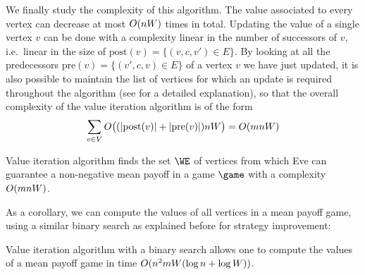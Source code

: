 We finally study the complexity of this algorithm. The
value associated to every vertex can decrease at most
$O(nW)$ times in total. Updating the value of a single
vertex $v$ can be done with a complexity linear in the number of
successors of $v$, i.e.~linear in the size of
$\mathrm{post}(v) = \{(v,c,v')\in E\}$. By looking at all the
predecessors $\mathrm{pre}(v) = \{(v',c,v)\in E\}$ of a vertex $v$ we
have just updated, it is also possible to maintain the list of
vertices for which an update is required throughout the algorithm (see
\cite{Brim&Chaloupka&Doyen&Gentilini&Raskin:2011} for a detailed
explanation), so that the overall complexity of the value iteration
algorithm is of the form
\[\sum_{v\in V}O\big((|\mathrm{post}(v)| +
  |\mathrm{pre}(v)|)nW\big) = O(mn W)\]
\begin{theorem}\label{4-thm:MP-value-iteration-Brim}
  Value iteration algorithm finds the set $\WE$ of vertices from which
  Eve can guarantee a non-negative mean payoff in a game $\game$ with a
  complexity $O(mnW)$.
\end{theorem}
As a corollary, we can compute the values of all vertices in a
mean payoff game, using a similar binary search as explained before for
strategy improvement:
\begin{theorem}\label{4-thm:MP-value-iteration-Brim-binary-search}
  Value iteration algorithm with a binary search allows one to compute
  the values of a mean payoff game in time
  $O(n^2 mW(\log n+\log W))$.
\end{theorem}


